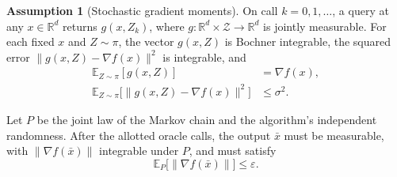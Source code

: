 \documentclass[10pt]{article}
\theoremstyle{definition}
\newtheorem{assumption}{Assumption}
\begin{document}
\begin{assumption}[Stochastic gradient moments]
On call $k=0,1,\ldots$, a query at any $x\in\mathbb{R}^d$ returns $g(x,Z_k)$, where $g:\mathbb{R}^d\times\mathcal Z\to\mathbb{R}^d$ is jointly measurable. For each fixed $x$ and $Z\sim\pi$, the vector $g(x,Z)$ is Bochner integrable, the squared error $\|g(x,Z)-\nabla f(x)\|^2$ is integrable, and
\[
\begin{aligned}
\mathbb{E}_{Z\sim\pi}[g(x,Z)] &= \nabla f(x),\\
\mathbb{E}_{Z\sim\pi}\big[\|g(x,Z)-\nabla f(x)\|^2\big] &\leq \sigma^2.
\end{aligned}
\]
\end{assumption}

Let $P$ be the joint law of the Markov chain and the algorithm's independent randomness. After the allotted oracle calls, the output $\bar{x}$ must be measurable, with $\|\nabla f(\bar{x})\|$ integrable under $P$, and must satisfy
\[
\mathbb{E}_{P}\big[\|\nabla f(\bar{x})\|\big]\leq\varepsilon.
\]
\end{document}
